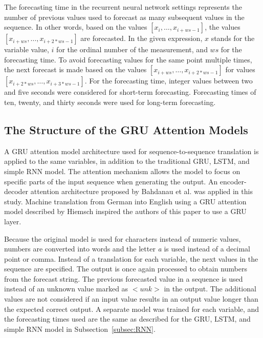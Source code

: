 \documentclass[preprint,12pt]{elsarticle}
\begin{document}
The forecasting time in the recurrent neural network settings represents the number of previous values used to forecast as many subsequent values in the sequence. In other words, based on the values $\left[x_{i}, \dots, x_{i+ws-1} \right]$, the values $\left[x_{i+ws}, \dots, x_{i +2*ws-1} \right]$ are forecasted. In the given expression, $x$ stands for the variable value, $i$ for the ordinal number of the measurement, and $ws$ for the forecasting time. To avoid forecasting values for the same point multiple times, the next forecast is made based on the values $\left[x_{i+ws}, \dots, x_{i+2*ws-1} \right]$ for values $\left[x_{i+2*ws}, \dots, x_{i+3*ws-1} \right]$. For the forecasting time, integer values between two and five seconds were considered for short-term forecasting. Forecasting times of ten, twenty, and thirty seconds were used for long-term forecasting.

\subsection{The Structure of the GRU Attention Models}

A GRU attention model architecture used for sequence-to-sequence translation is applied to the same variables, in addition to the traditional GRU, LSTM, and simple RNN model. The attention mechanism \cite{sutskever2014sequence, vaswani2017attention} allows the model to focus on specific parts of the input sequence when generating the output. An encoder-decoder attention architecture proposed by Bahdanau et al. \citep{bahdanau2014neural} was applied in this study. Machine translation from German into English using a GRU attention model described by Hiemsch \citep{Hiemsch2023} inspired the authors of this paper to use a GRU layer.

Because the original model is used for characters instead of numeric values, numbers are converted into words and the letter \textit{a} is used instead of a decimal point or comma. Instead of a translation for each variable, the next values in the sequence are specified. The output is once again processed to obtain numbers from the forecast string. The previous forecasted value in a sequence is used instead of an unknown value marked as $<unk>$ in the output. The additional values are not considered if an input value results in an output value longer than the expected correct output. A separate model was trained for each variable, and the forecasting times used are the same as described for the GRU, LSTM, and simple RNN model in Subsection~\ref{subsec:RNN}.
\end{document}
